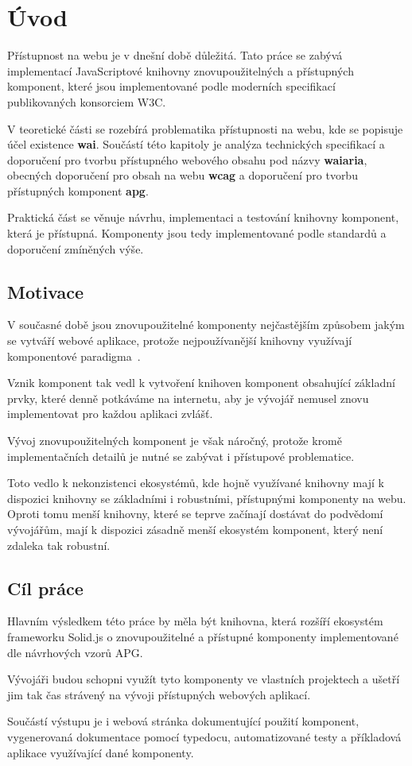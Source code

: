 \chapter{Úvod}

Přístupnost na webu je v dnešní době důležitá. Tato práce se zabývá implementací JavaScriptové knihovny
znovupoužitelných a přístupných komponent, které jsou implementované podle moderních specifikací publikovaných konsorciem W3C.

V teoretické části se rozebírá problematika přístupnosti na webu, kde se popisuje účel existence \textbf{\gls{wai}}.
Součástí této kapitoly je analýza technických specifikací a doporučení pro tvorbu přístupného webového obsahu
pod názvy \textbf{\gls{waiaria}}, obecných doporučení pro obsah na webu \textbf{\gls{wcag}} a doporučení pro tvorbu přístupných komponent \textbf{\gls{apg}}.

Praktická část se věnuje návrhu, implementaci a testování knihovny komponent, která je přístupná.
Komponenty jsou tedy implementované podle standardů a doporučení zmíněných výše.

\section{Motivace}

V současné době jsou znovupoužitelné komponenty nejčastějším způsobem jakým se vytváří webové aplikace, protože nejpoužívanější knihovny využívají komponentové paradigma~\cite{react,vue,solid,svelte}.

Vznik komponent tak vedl k vytvoření knihoven komponent obsahující základní prvky, které denně potkáváme na internetu, aby je vývojář nemusel znovu implementovat pro každou aplikaci zvlášť.

Vývoj znovupoužitelných komponent je však náročný, protože kromě implementačních detailů je nutné se zabývat i přístupové problematice.

Toto vedlo k nekonzistenci ekosystémů, kde hojně využívané knihovny mají k dispozici knihovny se základními i robustními, přístupnými komponenty na webu. Oproti tomu menší knihovny, které se teprve začínají dostávat do podvědomí vývojářům, mají k dispozici zásadně menší ekosystém komponent, který není zdaleka tak robustní.

\section{Cíl práce}

Hlavním výsledkem této práce by měla být knihovna, která rozšíří ekosystém frameworku Solid.js o znovupoužitelné a přístupné komponenty implementované dle návrhových vzorů APG.

Vývojáři budou schopni využít tyto komponenty ve vlastních projektech a ušetří jim tak čas strávený na vývoji přístupných webových aplikací.

Součástí výstupu je i webová stránka dokumentující použití komponent, vygenerovaná dokumentace pomocí typedocu, automatizované testy a příkladová aplikace využívající dané komponenty.
